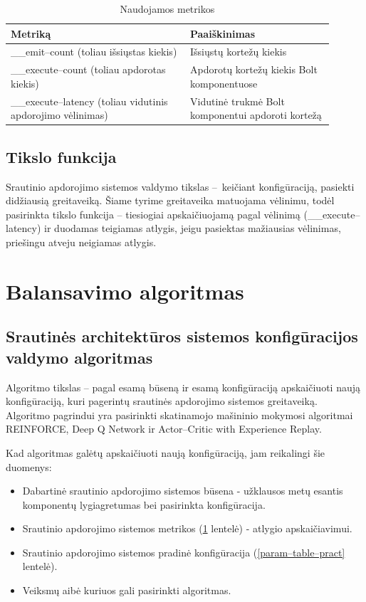 \documentclass{VUMIFPSbakalaurinis}
\begin{document}
\begin{longtable}{|p{0.5\linewidth}|p{0.4\linewidth}|}
    \caption{Naudojamos metrikos}
    \label{metrics–table}\\
    \hline
    \rowcolor[HTML]{C0C0C0} 
    Metriką                                  & Paaiškinimas            \\ \hline
    \endfirsthead
    \endhead
    \_\_emit–count (toliau išsiųstas kiekis)                           & Išsiųstų kortežų kiekis                    \\ \hline
    \_\_execute–count  (toliau apdorotas kiekis)                       & Apdorotų kortežų kiekis Bolt komponentuose \\ \hline
    \_\_execute–latency  (toliau vidutinis apdorojimo vėlinimas)       & Vidutinė trukmė Bolt komponentui apdoroti kortežą                                          \\ \hline
\end{longtable}

\subsection{Tikslo funkcija}

Srautinio apdorojimo sistemos valdymo tikslas – keičiant konfigūraciją, pasiekti didžiausią greitaveiką. Šiame tyrime greitaveika matuojama vėlinimu, todėl pasirinkta tikslo funkcija – tiesiogiai apskaičiuojamą pagal vėlinimą (\_\_execute–latency) ir duodamas teigiamas atlygis, jeigu pasiektas mažiausias vėlinimas, priešingu atveju neigiamas atlygis. 

\section{Balansavimo algoritmas}

\subsection{Srautinės architektūros sistemos konfigūracijos valdymo algoritmas}

Algoritmo tikslas – pagal esamą būseną ir esamą konfigūraciją apskaičiuoti naują konfigūraciją, kuri pagerintų srautinės apdorojimo sistemos greitaveiką. Algoritmo pagrindui yra pasirinkti skatinamojo mašininio mokymosi algoritmai REINFORCE, Deep Q Network ir Actor–Critic with Experience Replay.

Kad algoritmas galėtų apskaičiuoti naują konfigūraciją, jam reikalingi šie duomenys:
\begin{itemize}
    \item Dabartinė srautinio apdorojimo sistemos būsena - užklausos metų esantis komponentų lygiagretumas bei pasirinkta konfigūracija.
    \item Srautinio apdorojimo sistemos metrikos (\ref{metrics–table} lentelė) - atlygio apskaičiavimui.
    \item Srautinio apdorojimo sistemos pradinė konfigūracija (\ref{param–table–pract} lentelė).
    \item Veiksmų aibė kuriuos gali pasirinkti algoritmas.
\end{itemize}
\end{document}

